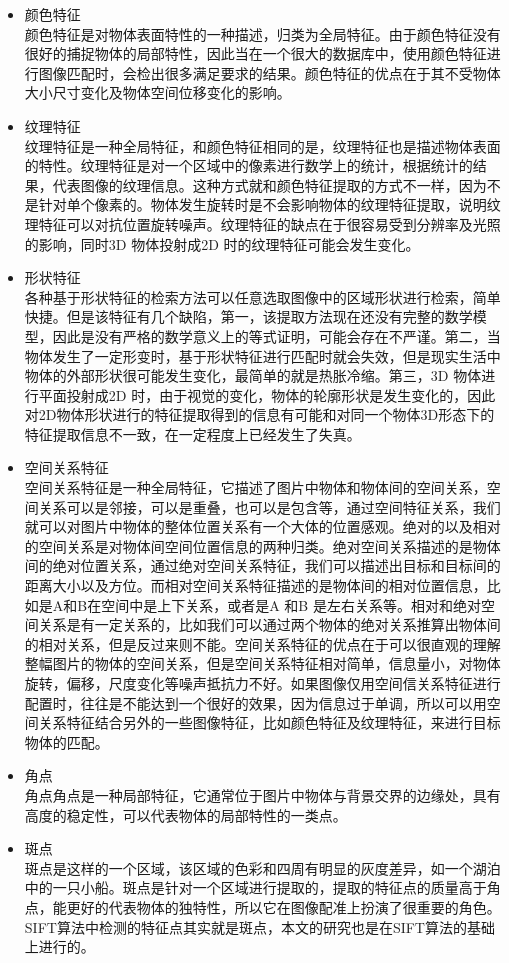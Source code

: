 \begin{itemize}
\item 颜色特征\\颜色特征是对物体表面特性的一种描述，归类为全局特征。由于颜色特征没有很好的捕捉物体的局部特性，因此当在一个很大的数据库中，使用颜色特征进行图像匹配时，会检出很多满足要求的结果。颜色特征的优点在于其不受物体大小尺寸变化及物体空间位移变化的影响。
\item 纹理特征\\纹理特征是一种全局特征，和颜色特征相同的是，纹理特征也是描述物体表面的特性。纹理特征是对一个区域中的像素进行数学上的统计，根据统计的结果，代表图像的纹理信息。这种方式就和颜色特征提取的方式不一样，因为不是针对单个像素的。物体发生旋转时是不会影响物体的纹理特征提取，说明纹理特征可以对抗位置旋转噪声。纹理特征的缺点在于很容易受到分辨率及光照的影响，同时3D 物体投射成2D 时的纹理特征可能会发生变化。
\item 形状特征\\各种基于形状特征的检索方法可以任意选取图像中的区域形状进行检索，简单快捷。但是该特征有几个缺陷，第一，该提取方法现在还没有完整的数学模型，因此是没有严格的数学意义上的等式证明，可能会存在不严谨。第二，当物体发生了一定形变时，基于形状特征进行匹配时就会失效，但是现实生活中物体的外部形状很可能发生变化，最简单的就是热胀冷缩。第三，3D 物体进行平面投射成2D 时，由于视觉的变化，物体的轮廓形状是发生变化的，因此对2D物体形状进行的特征提取得到的信息有可能和对同一个物体3D形态下的特征提取信息不一致，在一定程度上已经发生了失真。
\item 空间关系特征\\空间关系特征是一种全局特征，它描述了图片中物体和物体间的空间关系，空间关系可以是邻接，可以是重叠，也可以是包含等，通过空间特征关系，我们就可以对图片中物体的整体位置关系有一个大体的位置感观。绝对的以及相对的空间关系是对物体间空间位置信息的两种归类。绝对空间关系描述的是物体间的绝对位置关系，通过绝对空间关系特征，我们可以描述出目标和目标间的距离大小以及方位。而相对空间关系特征描述的是物体间的相对位置信息，比如是A和B在空间中是上下关系，或者是A 和B 是左右关系等。相对和绝对空间关系是有一定关系的，比如我们可以通过两个物体的绝对关系推算出物体间的相对关系，但是反过来则不能。空间关系特征的优点在于可以很直观的理解整幅图片的物体的空间关系，但是空间关系特征相对简单，信息量小，对物体旋转，偏移，尺度变化等噪声抵抗力不好。如果图像仅用空间信关系特征进行配置时，往往是不能达到一个很好的效果，因为信息过于单调，所以可以用空间关系特征结合另外的一些图像特征，比如颜色特征及纹理特征，来进行目标物体的匹配。
\item 角点 \\角点角点是一种局部特征，它通常位于图片中物体与背景交界的边缘处，具有高度的稳定性，可以代表物体的局部特性的一类点。
\item 斑点\\斑点是这样的一个区域，该区域的色彩和四周有明显的灰度差异，如一个湖泊中的一只小船。斑点是针对一个区域进行提取的，提取的特征点的质量高于角点，能更好的代表物体的独特性，所以它在图像配准上扮演了很重要的角色。SIFT算法中检测的特征点其实就是斑点，本文的研究也是在SIFT算法的基础上进行的。
\end{itemize}
